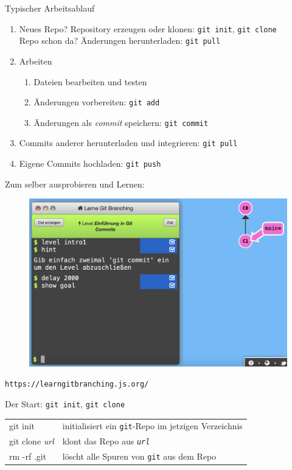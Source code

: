 \begin{frame}{Typischer Arbeitsablauf}
  \begin{enumerate}
    \item Neues Repo? Repository erzeugen oder klonen: \hfill\texttt{git init}, \texttt{git clone} \\
      Repo schon da? Änderungen herunterladen: \hfill\texttt{git pull}
    \item Arbeiten
      \begin{enumerate}
        \item Dateien bearbeiten und testen
        \item Änderungen vorbereiten: \hfill\texttt{git add}
        \item Änderungen als \emph{commit} speichern: \hfill\texttt{git commit}
      \end{enumerate}
    \item Commits anderer herunterladen und integrieren: \hfill\texttt{git pull}
    \item Eigene Commits hochladen: \hfill\texttt{git push}
  \end{enumerate}
\end{frame}

\begin{frame}{Zum selber ausprobieren und Lernen:}
  \begin{figure}
    \centering
    \includegraphics[width=.6\textwidth]{figures/learngitbranching.png}
  \end{figure}
  \texttt{https://learngitbranching.js.org/}
\end{frame}

\begin{frame}{Der Start: \texttt{git init}, \texttt{git clone}}
  \begin{tabu}{>{\ttfamily}l X[,L]}
    git init               & initialisiert ein \texttt{git}-Repo im jetzigen Verzeichnis \\
    git clone \textit{url} & klont das Repo aus \texttt{\textit{url}} \\
    rm -rf .git            & löscht alle Spuren von \texttt{git} aus dem Repo
  \end{tabu}
\end{frame}

